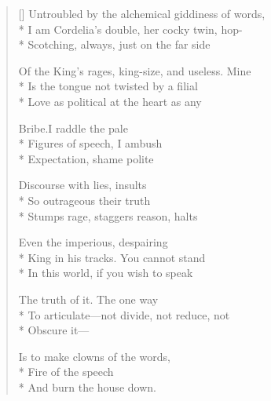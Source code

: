 \label{ch:lear_aj}
\begin{verse}[\versewidth]
 Untroubled by the alchemical giddiness of words,\\*
I am Cordelia's double, her cocky twin, hop-\\*
Scotching, always, just on the far side

Of the King's rages, king-size, and useless.   Mine\\*
Is the tongue not twisted by a filial\\*
Love as political at the heart as any

Bribe.\qquad I raddle the pale\\*
Figures of speech, I ambush\\*
Expectation, shame polite

Discourse with lies, insults\\*
So outrageous their truth\\*
Stumps rage, staggers reason, halts

Even the imperious, despairing\\*
King in his tracks.\hspace*{3\vgap} You cannot stand\\*
In this world, if you wish to speak

The truth of it.  The one way\\*
To articulate---not divide, not reduce, not\\*
Obscure it---

\hspace*{3\vgap} Is to make clowns of the words,\\*
Fire of the speech\\*
And burn the house down.
\end{verse}
